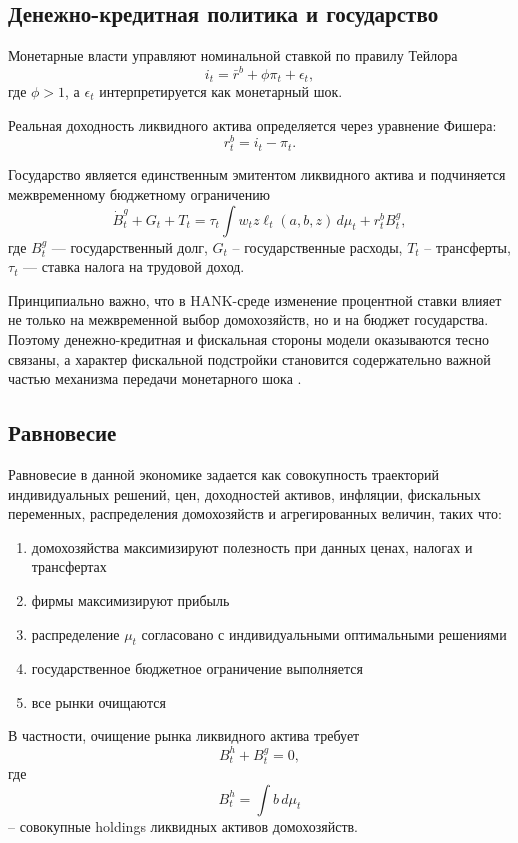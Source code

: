 \documentclass[12pt,a4paper]{article}
\begin{document}
\subsection{Денежно-кредитная политика и государство}

Монетарные власти управляют номинальной ставкой по правилу Тейлора
\[
i_t=\bar r^b+\phi \pi_t+\epsilon_t,
\]
где $\phi>1$, а $\epsilon_t$ интерпретируется как монетарный шок.

Реальная доходность ликвидного актива определяется через уравнение Фишера:
\[
r_t^b = i_t - \pi_t.
\]

Государство является единственным эмитентом ликвидного актива и подчиняется межвременному бюджетному ограничению
\[
\dot B_t^g + G_t + T_t
=
\tau_t \int w_t z \ell_t(a,b,z)\, d\mu_t
+
r_t^b B_t^g,
\]
где $B_t^g$ --- государственный долг, $G_t$ -- государственные расходы, $T_t$ -- трансферты, $\tau_t$ --- ставка налога на трудовой доход.

Принципиально важно, что в HANK-среде изменение процентной ставки влияет не только на межвременной выбор домохозяйств, но и на бюджет государства. Поэтому денежно-кредитная и фискальная стороны модели оказываются тесно связаны, а характер фискальной подстройки становится содержательно важной частью механизма передачи монетарного шока \cite{KaplanMollViolante2018}.

\subsection{Равновесие}

Равновесие в данной экономике задается как совокупность траекторий индивидуальных решений, цен, доходностей активов, инфляции, фискальных переменных, распределения домохозяйств и агрегированных величин, таких что:

\begin{enumerate}
    \item домохозяйства максимизируют полезность при данных ценах, налогах и трансфертах
    \item фирмы максимизируют прибыль
    \item распределение $\mu_t$ согласовано с индивидуальными оптимальными решениями
    \item государственное бюджетное ограничение выполняется
    \item все рынки очищаются
\end{enumerate}

В частности, очищение рынка ликвидного актива требует
\[
B_t^h + B_t^g = 0,
\]
где
\[
B_t^h = \int b\, d\mu_t
\]
-- совокупные holdings ликвидных активов домохозяйств.
\end{document}

